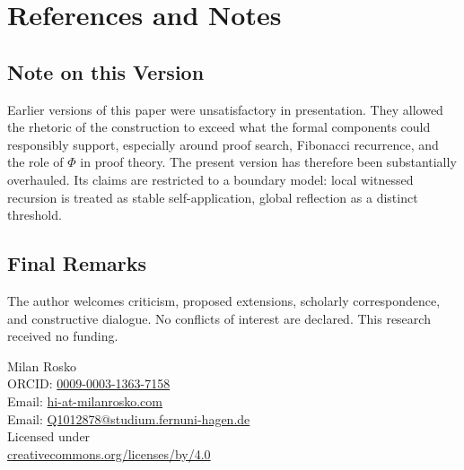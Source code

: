 \documentclass[letterpaper,10pt]{article}
\theoremstyle{upright}
\theoremstyle{upright}
\begin{document}
\clearpage
\vspace*{\fill}

\section*{References and Notes}

{\scriptsize

\setlength{\bibsep}{0.1em}
}

\subsection*{Note on this Version}

Earlier versions of this paper were unsatisfactory in presentation. They allowed the rhetoric of the construction to exceed what the formal components could responsibly support, especially around proof search, Fibonacci recurrence, and the role of $\Phi$ in proof theory. The present version has therefore been substantially overhauled. Its claims are restricted to a boundary model: local witnessed recursion is treated as stable self-application, global reflection as a distinct threshold.

\subsection*{Final Remarks}

The author welcomes criticism, proposed extensions, scholarly correspondence, and constructive dialogue. No conflicts of interest are declared. This research received no funding.


\begin{center}
	\scriptsize{
	\vspace{1em}
	Milan Rosko\\
	\vspace{1em}
	ORCID: \href{https://orcid.org/0009-0003-1363-7158}{\textsf{0009-0003-1363-7158}}\\[1ex]
	Email: \href{mailto:hi-at-milanrosko.com}{\textsf{hi-at-milanrosko.com}}\\[1ex]
	Email: \href{mailto:Q1012878@studium.fernuni-hagen.de}{\textsf{Q1012878@studium.fernuni-hagen.de}}\\
	\vspace{1em}
	Licensed under \ccby \\ \href{http://creativecommons.org/licenses/by/4.0/}{\scriptsize\textsf{creativecommons.org/licenses/by/4.0}}
	}
\end{center}
\vspace*{\fill}
\end{document}
